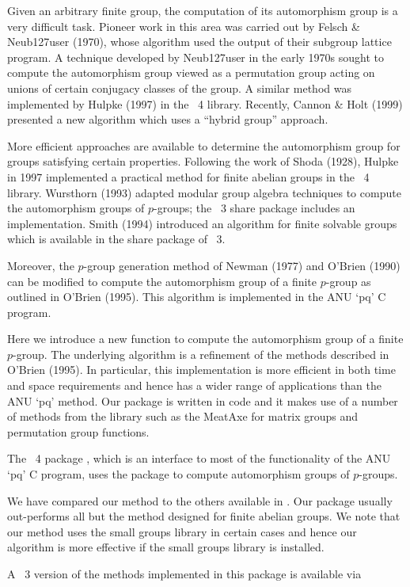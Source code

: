 

Given an arbitrary finite group, the computation of its automorphism
group is a very difficult task. Pioneer work in this area was carried 
out by Felsch \&  Neub{\accent127u}ser (1970), whose algorithm used 
the output of their subgroup lattice program. A technique developed 
by Neub{\accent127u}ser in the early 1970s sought to compute the 
automorphism group viewed as a permutation group acting on unions of 
certain conjugacy classes of the group. A similar method was implemented 
by Hulpke (1997) in the {\GAP}~4 library. Recently, Cannon \& Holt (1999) 
presented a new algorithm which uses a ``hybrid group'' approach. 

More efficient approaches are available to determine the automorphism 
group for groups satisfying certain properties. Following the work of 
Shoda (1928), Hulpke in 1997 implemented a practical method for finite 
abelian groups in the {\GAP}~4 library. Wursthorn (1993) adapted modular 
group algebra techniques to compute the automorphism groups of $p$-groups; 
the {\GAP}~3 share package  includes an implementation. Smith 
(1994) introduced an algorithm for finite solvable groups which is 
available in the  share package of {\GAP}~3. 

Moreover, the $p$-group generation method of Newman (1977) and O'Brien 
(1990) can be modified to compute the automorphism group of a finite 
$p$-group as outlined in O'Brien (1995). This algorithm is implemented 
in the ANU `pq' C program. 

Here we introduce a new function to compute the automorphism group of 
a finite $p$-group. The underlying algorithm is a refinement of the
methods described in O'Brien (1995). In particular, this implementation
is more efficient in both time and space requirements and hence has a 
wider range of applications than the ANU `pq' method. Our package is 
written in {\GAP} code and it makes use of a number of methods from the 
{\GAP} library such as the MeatAxe for matrix groups and 
permutation group functions. 

The {\GAP}~4 package , which is an interface to most of
the functionality of the ANU `pq' C program, uses the {\AutPGrp} package
to compute automorphism groups of $p$-groups.

We have compared our method to the others available in {\GAP}.
Our package usually out-performs all but the method designed 
for finite abelian groups. We note that our method uses the 
small groups library in certain cases and hence our algorithm
is more effective if the small groups library is installed.

A {\GAP}~3 version of the methods implemented in this package 
is available via 

